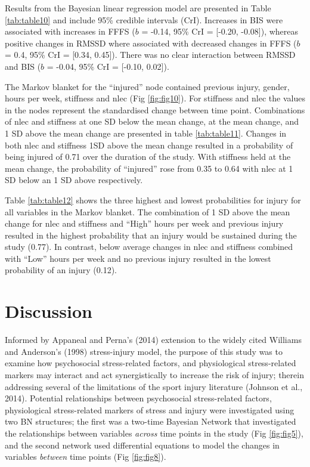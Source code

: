 \documentclass[
]{frontiersHLTH}
\begin{document}
Results from the Bayesian linear regression model are presented in Table
\ref{tab:table10} and include 95\% credible intervals (CrI). Increases
in BIS were associated with increases in FFFS (\(b\) = -0.14, 95\% CrI =
{[}-0.20, -0.08{]}), whereas positive changes in RMSSD where associated
with decreased changes in FFFS (\(b\) = 0.4, 95\% CrI = {[}0.34,
0.45{]}). There was no clear interaction between RMSSD and BIS (\(b\) =
-0.04, 95\% CrI = {[}-0.10, 0.02{]}).

The Markov blanket for the ``injured'' node contained previous injury,
gender, hours per week, stiffness and nlec (Fig \ref{fig:fig10}). For
stiffness and nlec the values in the nodes represent the standardised
change between time point. Combinations of nlec and stiffness at one SD
below the mean change, at the mean change, and 1 SD above the mean
change are presented in table \ref{tab:table11}. Changes in both nlec
and stiffness 1SD above the mean change resulted in a probability of
being injured of 0.71 over the duration of the study. With stiffness
held at the mean change, the probability of ``injured'' rose from 0.35
to 0.64 with nlec at 1 SD below an 1 SD above respectively.

Table \ref{tab:table12} shows the three highest and lowest probabilities
for injury for all variables in the Markov blanket. The combination of 1
SD above the mean change for nlec and stiffness and ``High'' hours per
week and previous injury resulted in the highest probability that an
injury would be sustained during the study (0.77). In contrast, below
average changes in nlec and stiffness combined with ``Low'' hours per
week and no previous injury resulted in the lowest probability of an
injury (0.12).

\hypertarget{discussion}{%
\section{Discussion}\label{discussion}}

Informed by Appaneal and Perna's (2014) extension to the widely cited
Williams and Anderson's (1998) stress-injury model, the purpose of this
study was to examine how psychosocial stress-related factors, and
physiological stress-related markers may interact and act
synergistically to increase the risk of injury; therein addressing
several of the limitations of the sport injury literature (Johnson et
al., 2014). Potential relationships between psychosocial stress-related
factors, physiological stress-related markers of stress and injury were
investigated using two BN structures; the first was a two-time Bayesian
Network that investigated the relationships between variables
\emph{across} time points in the study (Fig \ref{fig:fig5}), and the
second network used differential equations to model the changes in
variables \emph{between} time points (Fig \ref{fig:fig8}).
\end{document}
